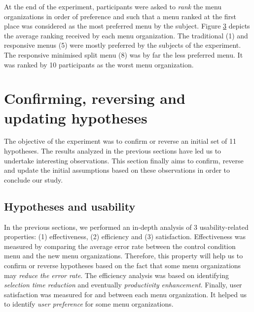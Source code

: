 \begin{figure}[!ht]
    
    \label{fig:satisfaction_ratio}
\end{figure}

\begin{figure}[!ht]
    
    \label{fig:satisfaction_gender}
\end{figure}

At the end of the experiment, participants were asked to \textit{rank} the menu 
organizations in order of preference and such that a menu ranked at the first 
place was considered as the most preferred menu by the subject. Figure 
\ref{fig:rankings} depicts the average ranking received by each menu 
organization. The traditional (1) and responsive menus (5) were mostly 
preferred by the subjects of the experiment. The responsive minimised split 
menu 
(8) was by far the less preferred menu. It was ranked by 10 participants as the 
worst menu organization.

\begin{figure}[!ht]
    
    \label{fig:rankings}
\end{figure}

\section{Confirming, reversing and updating hypotheses}
The objective of the experiment was to confirm or reverse an initial set of 
11 hypotheses. The results analyzed in the previous sections have led us to 
undertake interesting observations. This section finally aims to confirm, 
reverse and update the initial assumptions based on these observations in order 
to conclude our study.

\subsection{Hypotheses and usability}
In the previous sections, we performed an in-depth analysis of 3 
usability-related properties: (1) effectiveness, (2) efficiency and (3) 
satisfaction. Effectiveness was measured by comparing the average error rate 
between the control condition menu and the new menu organizations. Therefore, 
this property will help us to confirm or reverse hypotheses based on the fact 
that some menu organizations may \textit{reduce the error rate}. The efficiency 
analysis was based on identifying \textit{selection time reduction} and 
eventually \textit{productivity enhancement}. Finally, user satisfaction was 
measured for and between each menu organization. It helped us to identify 
\textit{user preference} for some menu organizations.\newline

